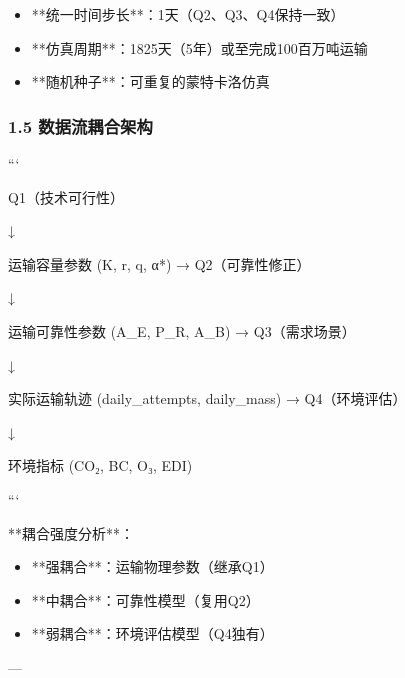 \documentclass[a4paper,12pt]{article}
\begin{document}
\par
\begin{itemize}
\item **统一时间步长**：1天（Q2、Q3、Q4保持一致）
\end{itemize}
\begin{itemize}
\item **仿真周期**：1825天（5年）或至完成100百万吨运输
\end{itemize}
\begin{itemize}
\item **随机种子**：可重复的蒙特卡洛仿真
\end{itemize}
\subsubsection{1.5 数据流耦合架构}
```

\par
Q1（技术可行性）

\par
↓

\par
运输容量参数 (K, r, q, α*) → Q2（可靠性修正）

\par
↓

\par
运输可靠性参数 (A\_E, P\_R, A\_B) → Q3（需求场景）

\par
↓

\par
实际运输轨迹 (daily\_attempts, daily\_mass) → Q4（环境评估）

\par
↓

\par
环境指标 (CO₂, BC, O₃, EDI)

\par
```

\par
**耦合强度分析**：

\par
\begin{itemize}
\item **强耦合**：运输物理参数（继承Q1）
\end{itemize}
\begin{itemize}
\item **中耦合**：可靠性模型（复用Q2）
\end{itemize}
\begin{itemize}
\item **弱耦合**：环境评估模型（Q4独有）
\end{itemize}
---
\end{document}

